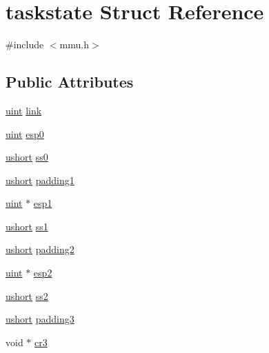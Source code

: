 \hypertarget{structtaskstate}{}\section{taskstate Struct Reference}
\label{structtaskstate}


{\ttfamily \#include $<$mmu.\+h$>$}

\subsection*{Public Attributes}
\begin{DoxyCompactItemize}
\item 
\hyperlink{types_8h_a91ad9478d81a7aaf2593e8d9c3d06a14}{uint} \hyperlink{structtaskstate_a31a48a737b004273004ba8473ab6b0ed}{link}
\item 
\hyperlink{types_8h_a91ad9478d81a7aaf2593e8d9c3d06a14}{uint} \hyperlink{structtaskstate_a41b3e1d46a5068485eb6714974a979d6}{esp0}
\item 
\hyperlink{types_8h_ab95f123a6c9bcfee6a343170ef8c5f69}{ushort} \hyperlink{structtaskstate_a574e97ea3fd87f314da88afec3c6f574}{ss0}
\item 
\hyperlink{types_8h_ab95f123a6c9bcfee6a343170ef8c5f69}{ushort} \hyperlink{structtaskstate_a6b87ceb039ec11ccd265818673c53df5}{padding1}
\item 
\hyperlink{types_8h_a91ad9478d81a7aaf2593e8d9c3d06a14}{uint} $\ast$ \hyperlink{structtaskstate_a7ec69acf5f95163bd1ca2548fb0c541a}{esp1}
\item 
\hyperlink{types_8h_ab95f123a6c9bcfee6a343170ef8c5f69}{ushort} \hyperlink{structtaskstate_ac70c36414956cfee04c733a5b530d8ef}{ss1}
\item 
\hyperlink{types_8h_ab95f123a6c9bcfee6a343170ef8c5f69}{ushort} \hyperlink{structtaskstate_ae1bd6ae664d5899c3e118c21a27ba065}{padding2}
\item 
\hyperlink{types_8h_a91ad9478d81a7aaf2593e8d9c3d06a14}{uint} $\ast$ \hyperlink{structtaskstate_af206a117571ede3752b043e4e8cc6016}{esp2}
\item 
\hyperlink{types_8h_ab95f123a6c9bcfee6a343170ef8c5f69}{ushort} \hyperlink{structtaskstate_a573d8f57ef11630e782d8b7c924f28ce}{ss2}
\item 
\hyperlink{types_8h_ab95f123a6c9bcfee6a343170ef8c5f69}{ushort} \hyperlink{structtaskstate_a7989f7ea66e6e2100ef68c9e6964c231}{padding3}
\item 
void $\ast$ \hyperlink{structtaskstate_ac891b558913b4528fd2c9351c99da201}{cr3}
\item 

\end{DoxyCompactItemize}
